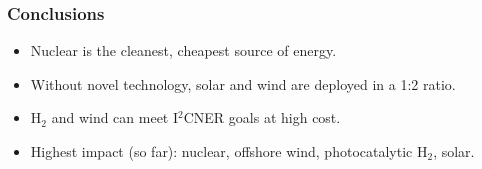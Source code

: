 \begin{frame}
  \frametitle{Conclusions}
        \begin{itemize}
        
        \item Nuclear is the cleanest, cheapest source of energy.
        
        \item Without novel technology, solar and wind are deployed in a 1:2 ratio.
        
        \item H$_2$ and wind can meet I$^2$CNER goals at high cost.
        
        \item Highest impact (so far): nuclear, offshore wind, photocatalytic H$_2$, solar.
 
        \end{itemize}
\end{frame}

